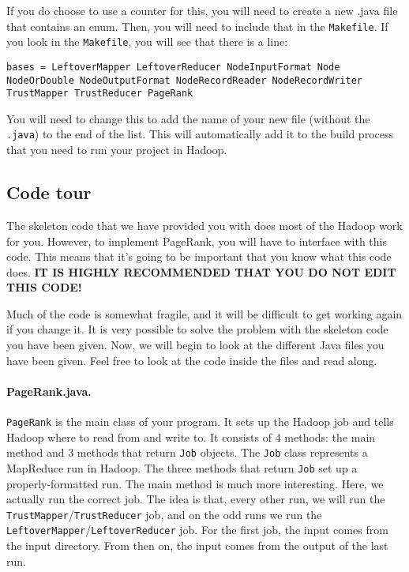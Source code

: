 \documentclass[10pt]{article}
\begin{document}
If you do choose to use a counter for this, you will need to create a new .java file that contains an enum. Then, you will need to include that in the \texttt{Makefile}. If you look in the \texttt{Makefile}, you will see that there is a line:

\texttt{bases = LeftoverMapper LeftoverReducer NodeInputFormat Node NodeOrDouble NodeOutputFormat NodeRecordReader NodeRecordWriter TrustMapper TrustReducer PageRank}

You will need to change this to add the name of your new file (without the \texttt{.java}) to the end of the list. This will automatically add it to the build process that you need to run your project in Hadoop.


\subsection{Code tour}

The skeleton code that we have provided you with does most of the Hadoop work for you. However, to implement PageRank, you will have to interface with this code. This means that it's going to be important that you know what this code does. \textbf{IT IS HIGHLY RECOMMENDED THAT YOU DO NOT EDIT THIS CODE!}

Much of the code is somewhat fragile, and it will be difficult to get working again if you change it. It is very possible to solve the problem with the skeleton code you have been given. Now, we will begin to look at the different Java files you have been given. Feel free to look at the code inside the files and read along.

\paragraph{PageRank.java.}
\texttt{PageRank} is the main class of your program. It sets up the Hadoop job and tells Hadoop where to read from and write to. It consists of 4 methods: the main method and 3 methods that return \texttt{Job} objects. The \texttt{Job} class represents a MapReduce run in Hadoop. The three methods that return \texttt{Job} set up a properly-formatted run. The main method is much more interesting. Here, we actually run the correct job. The idea is that, every other run, we will run the \texttt{TrustMapper}/\texttt{TrustReducer} job, and on the odd runs we run the \texttt{LeftoverMapper}/\texttt{LeftoverReducer} job. For the first job, the input comes from the input directory. From then on, the input comes from the output of the last run.
\end{document}
